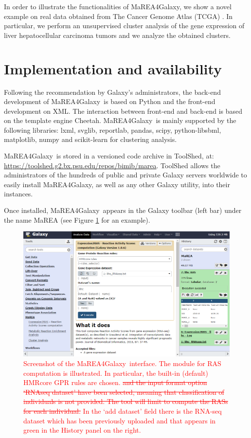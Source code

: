 \documentclass[preprint,12pt,authoryear]{elsarticle}
\newcommand{\red}{\textcolor{red}}
\newcommand{\mareagalaxy}{\textsf{MaREA4Galaxy}}
\begin{document}
In order to illustrate the functionalities of \mareagalaxy, we show a novel example on real data obtained from The Cancer Genome Atlas (TCGA) \citep{TCGA}. In particular, we perform an unsupervised cluster analysis of the gene expression of liver hepatocellular carcinoma tumors and we analyze the obtained clusters.

\section{Implementation and availability}
Following the recommendation by Galaxy's administrators, the back-end development of \mareagalaxy\ is based on Python and the front-end development on XML. The interaction between front-end and back-end is based on the template engine Cheetah. 
\mareagalaxy\ is mainly supported by the following libraries:  lxml, svglib, reportlab, pandas, scipy, python-libsbml, matplotlib, numpy and scikit-learn for clustering analysis.

\mareagalaxy\ is stored in a versioned code archive in ToolShed, at: \\ \url{https://toolshed.g2.bx.psu.edu/repos/bimib/marea}. 
ToolShed allows the administrators of the hundreds of public and private Galaxy servers worldwide to easily install \mareagalaxy, as well as any other Galaxy utility, into their instances.

Once installed, \mareagalaxy\ appears in the Galaxy toolbar (left bar) under the name \textsf{MaREA} (see Figure \ref{fig:screenshot1} for an example).

\begin{figure}[ht]
    \includegraphics[width=1\textwidth]{figs/screenshot1v2q.png}
	\caption{\red{Screenshot of the \mareagalaxy\ interface. The module for RAS computation is illustrated. In particular, the built-in (default) HMRcore GPR rules are chosen. \sout{and the input format option `RNAseq dataset' have been selected, meaning that classification of individuals is not provided. The tool will limit to compute the RASs for each individual.} In the `add dataset' field there is the RNA-seq dataset which has been previously uploaded and that appears in green in the History panel on the right.}}
	\label{fig:screenshot1}
\end{figure}
\end{document}
